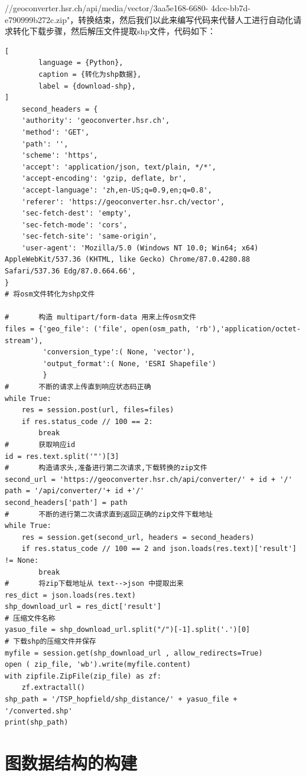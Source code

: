 //geoconverter.hsr.ch/api/media/vector/3aa5e168-6680-
4dce-bb7d-e790999b272c.zip"，转换结束，然后我们以此来编写代码来代替人工进行自动化请求转化下载步骤，然后解压文件提取shp文件，代码如下：\\
\begin{lstlisting}[
        language = {Python},
        caption = {转化为shp数据},
        label = {download-shp},
]
    second_headers = {
    'authority': 'geoconverter.hsr.ch',
    'method': 'GET',
    'path': '',
    'scheme': 'https',
    'accept': 'application/json, text/plain, */*',
    'accept-encoding': 'gzip, deflate, br',
    'accept-language': 'zh,en-US;q=0.9,en;q=0.8',
    'referer': 'https://geoconverter.hsr.ch/vector',
    'sec-fetch-dest': 'empty',
    'sec-fetch-mode': 'cors',
    'sec-fetch-site': 'same-origin',
    'user-agent': 'Mozilla/5.0 (Windows NT 10.0; Win64; x64) AppleWebKit/537.36 (KHTML, like Gecko) Chrome/87.0.4280.88 Safari/537.36 Edg/87.0.664.66',
}
# 将osm文件转化为shp文件

#       构造 multipart/form-data 用来上传osm文件
files = {'geo_file': ('file', open(osm_path, 'rb'),'application/octet-stream'),
         'conversion_type':( None, 'vector'),
         'output_format':( None, 'ESRI Shapefile')
         }
#       不断的请求上传直到响应状态码正确
while True:
    res = session.post(url, files=files)
    if res.status_code // 100 == 2:
        break
#       获取响应id
id = res.text.split('"')[3]
#       构造请求头,准备进行第二次请求,下载转换的zip文件
second_url = 'https://geoconverter.hsr.ch/api/converter/' + id + '/'
path = '/api/converter/'+ id +'/'
second_headers['path'] = path
#       不断的进行第二次请求直到返回正确的zip文件下载地址
while True:
    res = session.get(second_url, headers = second_headers)
    if res.status_code // 100 == 2 and json.loads(res.text)['result'] != None:
        break
#       将zip下载地址从 text-->json 中提取出来
res_dict = json.loads(res.text)
shp_download_url = res_dict['result']
# 压缩文件名称
yasuo_file = shp_download_url.split("/")[-1].split('.')[0]
# 下载shp的压缩文件并保存
myfile = session.get(shp_download_url , allow_redirects=True)
open ( zip_file, 'wb').write(myfile.content)
with zipfile.ZipFile(zip_file) as zf:
    zf.extractall()
shp_path = '/TSP_hopfield/shp_distance/' + yasuo_file + '/converted.shp'
print(shp_path)
\end{lstlisting}
\section{图数据结构的构建}
